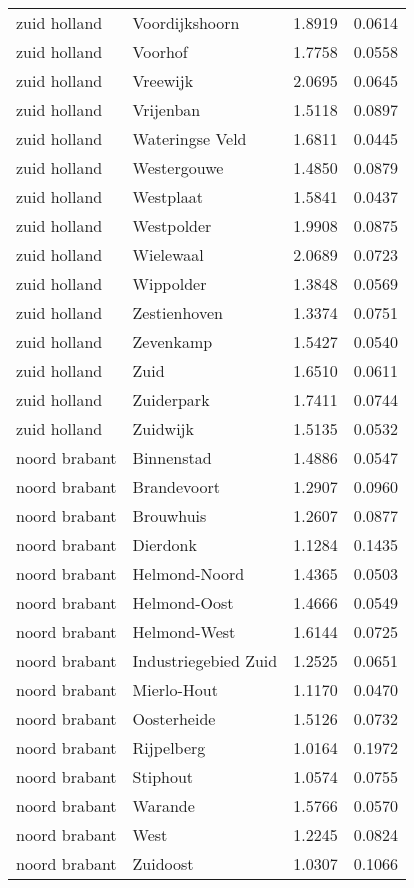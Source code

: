 \begin{longtable}{llcc}
zuid holland & Voordijkshoorn & 1.8919 & 0.0614 \\
zuid holland & Voorhof & 1.7758 & 0.0558 \\
zuid holland & Vreewijk & 2.0695 & 0.0645 \\
zuid holland & Vrijenban & 1.5118 & 0.0897 \\
zuid holland & Wateringse Veld & 1.6811 & 0.0445 \\
zuid holland & Westergouwe & 1.4850 & 0.0879 \\
zuid holland & Westplaat & 1.5841 & 0.0437 \\
zuid holland & Westpolder & 1.9908 & 0.0875 \\
zuid holland & Wielewaal & 2.0689 & 0.0723 \\
zuid holland & Wippolder & 1.3848 & 0.0569 \\
zuid holland & Zestienhoven & 1.3374 & 0.0751 \\
zuid holland & Zevenkamp & 1.5427 & 0.0540 \\
zuid holland & Zuid & 1.6510 & 0.0611 \\
zuid holland & Zuiderpark & 1.7411 & 0.0744 \\
zuid holland & Zuidwijk & 1.5135 & 0.0532 \\
noord brabant & Binnenstad & 1.4886 & 0.0547 \\
noord brabant & Brandevoort & 1.2907 & 0.0960 \\
noord brabant & Brouwhuis & 1.2607 & 0.0877 \\
noord brabant & Dierdonk & 1.1284 & 0.1435 \\
noord brabant & Helmond-Noord & 1.4365 & 0.0503 \\
noord brabant & Helmond-Oost & 1.4666 & 0.0549 \\
noord brabant & Helmond-West & 1.6144 & 0.0725 \\
noord brabant & Industriegebied Zuid & 1.2525 & 0.0651 \\
noord brabant & Mierlo-Hout & 1.1170 & 0.0470 \\
noord brabant & Oosterheide & 1.5126 & 0.0732 \\
noord brabant & Rijpelberg & 1.0164 & 0.1972 \\
noord brabant & Stiphout & 1.0574 & 0.0755 \\
noord brabant & Warande & 1.5766 & 0.0570 \\
noord brabant & West & 1.2245 & 0.0824 \\
noord brabant & Zuidoost & 1.0307 & 0.1066 \\

\end{longtable}
